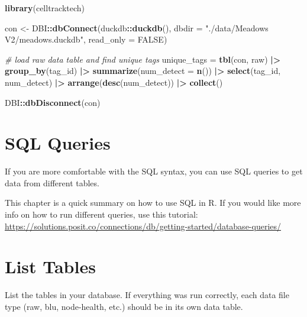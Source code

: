 \documentclass[
]{book}
\newenvironment{Shaded}{\begin{snugshade}}{\end{snugshade}}
\newcommand{\AttributeTok}[1]{\textcolor[rgb]{0.13,0.29,0.53}{#1}}
\newcommand{\CommentTok}[1]{\textcolor[rgb]{0.56,0.35,0.01}{\textit{#1}}}
\newcommand{\ConstantTok}[1]{\textcolor[rgb]{0.56,0.35,0.01}{#1}}
\newcommand{\FunctionTok}[1]{\textcolor[rgb]{0.13,0.29,0.53}{\textbf{#1}}}
\newcommand{\NormalTok}[1]{#1}
\newcommand{\OtherTok}[1]{\textcolor[rgb]{0.56,0.35,0.01}{#1}}
\newcommand{\SpecialCharTok}[1]{\textcolor[rgb]{0.81,0.36,0.00}{\textbf{#1}}}
\newcommand{\StringTok}[1]{\textcolor[rgb]{0.31,0.60,0.02}{#1}}
\begin{document}
\begin{Shaded}
\begin{Highlighting}[]
\FunctionTok{library}\NormalTok{(celltracktech)}

\NormalTok{con }\OtherTok{\textless{}{-}}\NormalTok{ DBI}\SpecialCharTok{::}\FunctionTok{dbConnect}\NormalTok{(duckdb}\SpecialCharTok{::}\FunctionTok{duckdb}\NormalTok{(), }
                      \AttributeTok{dbdir =} \StringTok{"./data/Meadows V2/meadows.duckdb"}\NormalTok{, }
                      \AttributeTok{read\_only =} \ConstantTok{FALSE}\NormalTok{)}

\CommentTok{\# load raw data table and find unique tags}
\NormalTok{unique\_tags }\OtherTok{=} \FunctionTok{tbl}\NormalTok{(con, }\StringTok{\textquotesingle{}raw\textquotesingle{}}\NormalTok{) }\SpecialCharTok{|\textgreater{}} 
  \FunctionTok{group\_by}\NormalTok{(tag\_id) }\SpecialCharTok{|\textgreater{}}
  \FunctionTok{summarize}\NormalTok{(}\AttributeTok{num\_detect =} \FunctionTok{n}\NormalTok{()) }\SpecialCharTok{|\textgreater{}}
  \FunctionTok{select}\NormalTok{(tag\_id, num\_detect) }\SpecialCharTok{|\textgreater{}}
  \FunctionTok{arrange}\NormalTok{(}\FunctionTok{desc}\NormalTok{(num\_detect)) }\SpecialCharTok{|\textgreater{}}
  \FunctionTok{collect}\NormalTok{()}

\NormalTok{DBI}\SpecialCharTok{::}\FunctionTok{dbDisconnect}\NormalTok{(con)}
\end{Highlighting}
\end{Shaded}

\section{SQL Queries}\label{sql-queries}

If you are more comfortable with the SQL syntax, you can use SQL queries to get data from different tables.

This chapter is a quick summary on how to use SQL in R. If you would like more info on how to run different queries, use this tutorial: \url{https://solutions.posit.co/connections/db/getting-started/database-queries/}

\section{List Tables}\label{list-tables}

List the tables in your database. If everything was run correctly, each data file type (raw, blu, node-health, etc.) should be in its own data table.
\end{document}
